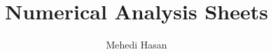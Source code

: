 \documentclass[12pt,oneside]{book}
\begin{document}
\title{Numerical Analysis Sheets}
\author{Mehedi Hasan}
\maketitle
\newpage

\newpage
\tableofcontents
\newpage
{}





\end{document}
